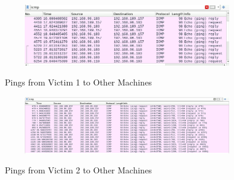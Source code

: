 \begin{figure}[H]
  \centering
  \includegraphics[width=0.8\textwidth]{img/level1/level1-192-168-96-183.png}
  \caption{Pings from Victim 1 to Other Machines}\label{fig:PingVictim1}
\end{figure}

\begin{figure}[H]
  \centering
  \includegraphics[width=0.8\textwidth]{img/level1/level1-192-168-109-157.png}
  \caption{Pings from Victim 2 to Other Machines}\label{fig:PingVictim2}
\end{figure}